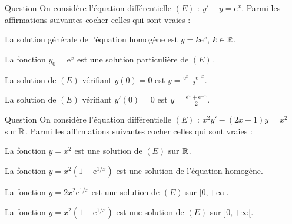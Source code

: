 \begin{multi}[multiple,feedback=
{La solution générale de l'équation homogène est \(y=k\mathrm{e}^{x}\), \(k\in \Rr\). On cherche une solution particulière sous la forme \(\displaystyle y_0=a\mathrm{e}^{x}\). La solution générale de \((E)\) est \(\displaystyle y=k\mathrm{e}^{-x}+\frac{\mathrm{e}^{x}}{2}\), \(k\in \Rr\). La condition \(y(0)=0\) donne \(k=-1/2\), et la condition \(y'(0)=0\) donne \(k=1/2\).
}]{Question}
On considère l'équation différentielle \((E)\) : \(\displaystyle y'+y=\mathrm{e}^{x}\). Parmi les affirmations suivantes cocher celles qui sont vraies :

    \item La solution générale de l'équation homogène est \(y=k\mathrm{e}^{x}\), \(k\in \Rr\).
    \item La fonction \(\displaystyle y_0=\mathrm{e}^{x}\) est une solution particulière de \((E)\).
    \item* La solution de \((E)\) vérifiant \(y(0)=0\) est \(\displaystyle y=\frac{\mathrm{e}^{x}-\mathrm{e}^{-x}}{2}\).
    \item* La solution de \((E)\) vérifiant \(y'(0)=0\) est \(\displaystyle y=\frac{\mathrm{e}^{x}+\mathrm{e}^{-x}}{2}\).
\end{multi}


\begin{multi}{Question}
On considère l'équation différentielle \((E)\) : \(\displaystyle x^2y'-(2x-1)y=x^2\) sur \(\mathbb{R}\). Parmi les affirmations suivantes cocher celles qui sont vraies :

    \item* La fonction \(\displaystyle y=x^2\) est une solution de \((E)\) sur \(\mathbb{R}\).
    \item La fonction \(\displaystyle y=x^2\left(1-\mathrm{e}^{1/x}\right)\) est une solution de l'équation homogène.
    \item La fonction \(\displaystyle y=2x^2\mathrm{e}^{1/x}\) est une solution de \((E)\) sur \(]0,+\infty[\).
    \item* La fonction \(\displaystyle y=x^2\left(1-\mathrm{e}^{1/x}\right)\) est une solution de \((E)\) sur \(]0,+\infty[\).
\end{multi}


